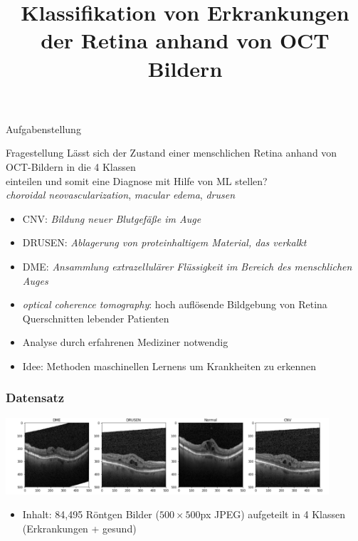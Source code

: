 \documentclass[aspectratio=1610, professionalfonts, 9pt]{beamer}
\title{Klassifikation von Erkrankungen der Retina anhand von OCT Bildern}
\institute[E4/5]{TU Dortmund \\  Physik}
\begin{document}
\maketitle

\begin{frame}{Aufgabenstellung}
  \begin{block}{Fragestellung}
    \centering
    Lässt sich der Zustand einer menschlichen Retina anhand von OCT-Bildern in die 4 Klassen
    \begin{equation*}
        [\text{NORMAL}, \text{CNV}, \text{DRUSEN}, \text{DME}]
    \end{equation*}
    einteilen und somit eine Diagnose mit Hilfe von ML stellen? \\
    \textit{choroidal neovascularization}, \textit{macular edema}, \textit{drusen}
  \begin{itemize}
    \item CNV: \textit{Bildung neuer Blutgefäße im Auge}
    \item DRUSEN: \textit{Ablagerung von proteinhaltigem Material, das verkalkt}
    \item DME: \textit{Ansammlung extrazellulärer Flüssigkeit im Bereich des menschlichen Auges}
  \end{itemize}
  \end{block}
  \begin{itemize}
    \item \textit{optical coherence tomography}: hoch auflösende Bildgebung von Retina Querschnitten lebender Patienten
    \item Analyse durch erfahrenen Mediziner notwendig
    \item Idee: Methoden maschinellen Lernens um Krankheiten zu erkennen
  \end{itemize}
\end{frame}

\begin{frame}
    \frametitle{Datensatz}
    \centering
    \includegraphics[width=0.9\textwidth]{images/examples.png}\\
    \begin{itemize}
        \item Inhalt: 84,495 Röntgen Bilder ($500\times500$px JPEG) aufgeteilt in 4 Klassen (Erkrankungen + gesund)
    \end{itemize}
\end{frame}
\end{document}

